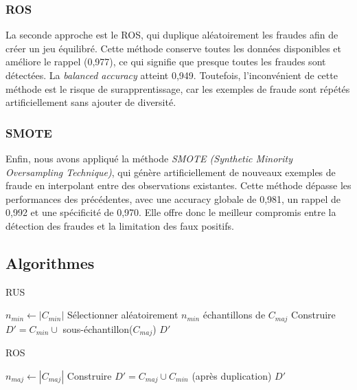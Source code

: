 \documentclass{article}
\begin{document}
\subsubsection*{ROS}
La seconde approche est le ROS, qui duplique aléatoirement les fraudes afin de créer un jeu équilibré.
Cette méthode conserve toutes les données disponibles et améliore le rappel (0,977), ce qui signifie que presque toutes les fraudes sont détectées.
La \textit{balanced accuracy} atteint 0,949.
Toutefois, l’inconvénient de cette méthode est le risque de surapprentissage, car les exemples de fraude sont répétés artificiellement sans ajouter de diversité.

\subsubsection*{SMOTE}
Enfin, nous avons appliqué la méthode \textit{SMOTE (Synthetic Minority Oversampling Technique)}, qui génère artificiellement de nouveaux exemples de fraude en interpolant entre des observations existantes.
Cette méthode dépasse les performances des précédentes, avec une accuracy globale de 0,981, un rappel de 0,992 et une spécificité de 0,970.
Elle offre donc le meilleur compromis entre la détection des fraudes et la limitation des faux positifs.


\vspace{1cm}


\subsection{Algorithmes}

\begin{algorithm}[H]
\caption{RUS}

$n_{min} \gets |C_{min}|$ \;
Sélectionner aléatoirement $n_{min}$ échantillons de $C_{maj}$\;
Construire $D' = C_{min} \cup$ sous-échantillon($C_{maj}$)\;
\Return $D'$\;
\end{algorithm}

\vspace{1cm}

\begin{algorithm}[H]
\caption{ROS}

$n_{maj} \gets |C_{maj}|$ \;
Construire $D' = C_{maj} \cup C_{min}$ (après duplication)\;
\Return $D'$\;
\end{algorithm}
\end{document}
